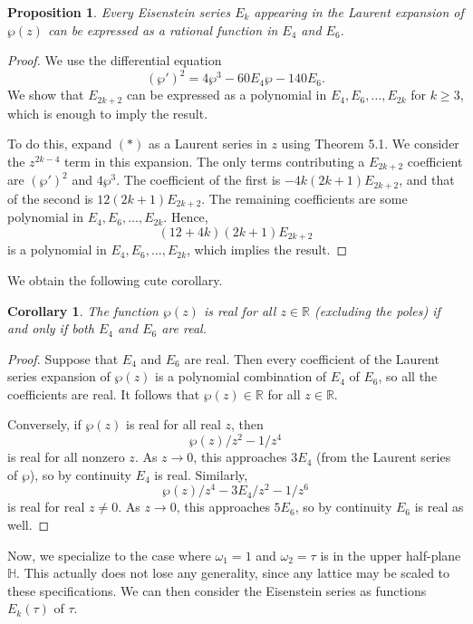 \documentclass[12pt,reqno]{amsart}
\theoremstyle{plain}
\newtheorem{cor}[thm]{Corollary}
\newtheorem{prop}[thm]{Proposition}
\numberwithin{equation}{section}
\begin{document}
\begin{prop}
    Every Eisenstein series $E_k$ appearing in the Laurent expansion of $\wp(z)$ can be expressed as a rational function in $E_4$ and $E_6$.
\end{prop}
\begin{proof}
We use the differential equation
\[(\wp')^2 = 4\wp^3 - 60E_4 \wp - 140 E_6.\tag{$*$}\]
We show that $E_{2k+2}$ can be expressed as a polynomial in $E_4,E_6,\dots, E_{2k}$ for $k\ge 3$, which is enough to imply the result.

To do this, expand $(*)$ as a Laurent series in $z$ using Theorem 5.1. We consider the $z^{2k-4}$ term in this expansion. The only terms contributing a $E_{2k+2}$ coefficient are $(\wp')^2$ and $4\wp^3$. The coefficient of the first is $-4k(2k+1)E_{2k+2}$, and that of the second is $12(2k+1)E_{2k+2}$. The remaining coefficients are some polynomial in $E_4,E_6,\dots, E_{2k}$. Hence, \[(12+4k)(2k+1)E_{2k+2}\] is a polynomial in $E_4,E_6,\dots, E_{2k}$, which implies the result.
\end{proof}
We obtain the following cute corollary.
\begin{cor}
    The function $\wp(z)$ is real for all $z\in \mathbb R$ (excluding the poles) if and only if both $E_4$ and $E_6$ are real.
\end{cor}
\begin{proof}
Suppose that $E_4$ and $E_6$ are real. Then every coefficient of the Laurent series expansion of $\wp(z)$ is a polynomial combination of $E_4$ of $E_6$, so all the coefficients are real. It follows that $\wp(z)\in \mathbb R$ for all $z\in \mathbb R$. 

Conversely, if $\wp(z)$ is real for all real $z$, then \[\wp(z)/z^2 - 1/z^4 \] is real for all nonzero $z$. As $z\to 0$, this approaches $3E_4$ (from the Laurent series of $\wp$), so by continuity $E_4$ is real. Similarly, \[\wp(z)/z^4 - 3E_4/z^2 - 1/z^6\] is real for real $z\ne 0$. As $z\to 0$, this approaches $5E_6$, so by continuity $E_6$ is real as well.
\end{proof}
Now, we specialize to the case where $\omega_1 = 1$ and $\omega_2 = \tau$ is in the upper half-plane $\mathbb H$. This actually does not lose any generality, since any lattice may be scaled to these specifications. We can then consider the Eisenstein series as functions $E_k(\tau)$ of $\tau$. 
\end{document}
